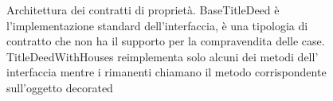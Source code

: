 \begin{figure}[H]
    \centering
    \caption{Architettura dei contratti di proprietà. BaseTitleDeed è l'implementazione standard dell'interfaccia, è una tipologia di 
    contratto che non ha il supporto per la compravendita delle case. TitleDeedWithHouses reimplementa solo alcuni dei metodi dell' interfaccia
    mentre i rimanenti chiamano il metodo corrispondente sull'oggetto decorated}
	\label{img:TitleDeed}
\end{figure}
